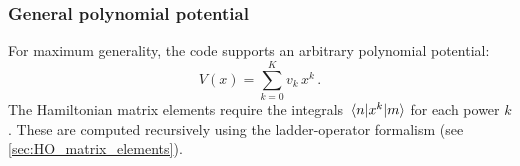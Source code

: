 \subsubsection{General polynomial potential}

For maximum generality, the code supports an arbitrary polynomial potential:
\begin{equation}\label{eq:V_poly}
  V(x) = \sum_{k=0}^{K} v_k\,x^k\,.
\end{equation}
The Hamiltonian matrix elements require the integrals $\mel{n}{x^k}{m}$ for each power $k$.
These are computed recursively using the ladder-operator formalism (see \cref{sec:HO_matrix_elements}).


